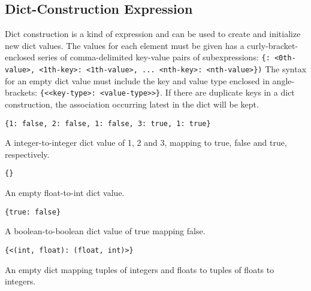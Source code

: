 
\subsection{Dict-Construction Expression}
{
	Dict construction is a kind of expression and can be
	used to create and initialize new dict values.
	The values for each element must be given has a curly-bracket-enclosed
	series of comma-delimited
	key-value pairs of
	subexpressions: \texttt{\{<0th-key>: <0th-value>, <1th-key>: <1th-value>, ... <nth-key>: <nth-value>\})}
	The syntax for an empty dict value must include the key and value
	type enclosed
	in angle-brackets: \texttt{\{<<key-type>: <value-type>>\}}.
	If there are duplicate keys in a dict construction, the
	association occurring latest in
	the dict will be kept.
	
	\begin{itemize}
	{
		\item \texttt{\{1: false, 2: false, 1: false, 3: true, 1: true\}}
		
			A integer-to-integer dict value of 1, 2 and 3, mapping to true,
			false and true, respectively.
		
		\item \texttt{\{<float: int>\}}
		
			An empty float-to-int dict value.
		
		\item \texttt{\{true: false\}}
		
			A boolean-to-boolean dict value of
			true mapping false.
		
		\item \texttt{\{<(int, float): (float, int)>\}}
		
			An empty dict mapping
			tuples of integers and floats to tuples of floats to integers.
	}
	\end{itemize}
}
